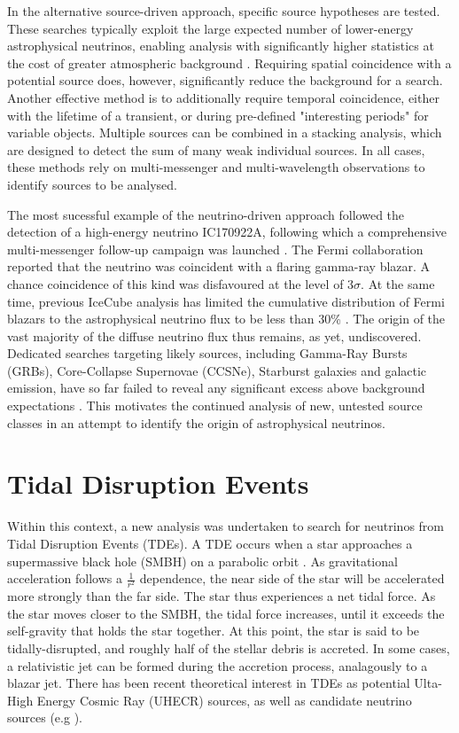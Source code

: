 \documentclass{PoS}
\begin{document}
In the alternative source-driven approach, specific source hypotheses are tested. These searches typically exploit the large expected number of lower-energy astrophysical neutrinos, enabling analysis with significantly higher statistics at the cost of greater atmospheric background \cite{Aartsen:2016oji}. Requiring spatial coincidence with a potential source does, however, significantly reduce the background for a search. Another effective method is to additionally require temporal coincidence, either with the lifetime of a transient, or during  pre-defined "interesting periods" for variable objects. Multiple sources can be combined in a stacking analysis, which are designed to detect the sum of many weak individual sources. In all cases, these methods rely on multi-messenger and multi-wavelength observations to identify sources to be analysed.

The most sucessful example of the neutrino-driven approach followed the detection of a high-energy neutrino  IC170922A, following which a comprehensive multi-messenger follow-up campaign was launched \cite{IceCube:2018dnn}. The Fermi collaboration reported that the neutrino was coincident with a flaring gamma-ray blazar. A chance coincidence of this kind was disfavoured at the level of 3$\sigma$. At the same time, previous IceCube analysis has limited the cumulative distribution of Fermi blazars to the astrophysical neutrino flux to be less than 30\% \cite{Aartsen:2016lir}. The origin of the vast majority of the diffuse neutrino flux thus remains, as yet, undiscovered. Dedicated searches targeting likely sources, including Gamma-Ray Bursts (GRBs), Core-Collapse Supernovae (CCSNe), Starburst galaxies and galactic emission, have so far failed to reveal any significant excess above background expectations \cite{Stasik2018Search}. This motivates the continued analysis of new, untested source classes in an attempt to identify the origin of astrophysical neutrinos.

\section{Tidal Disruption Events}

Within this context, a new analysis was undertaken to search for neutrinos from Tidal Disruption Events (TDEs). A TDE occurs when a star approaches a supermassive black hole (SMBH) on a parabolic orbit \cite{Komossa:2015qya}. As gravitational acceleration follows a $\frac{1}{r^{2}}$ dependence, the near side of the star will be accelerated more strongly than the far side. The star thus experiences a net tidal force. As the star moves closer to the SMBH, the tidal force increases, until it exceeds the self-gravity that holds the star together. At this point, the star is said to be tidally-disrupted, and roughly half of the stellar debris is accreted. In some cases, a relativistic jet can be formed during the accretion process, analagously to a blazar jet. There has been recent theoretical interest in TDEs as potential Ulta-High Energy Cosmic Ray (UHECR) sources, as well as candidate neutrino sources (e.g \cite{Biehl:2017hnb}).
\end{document}

